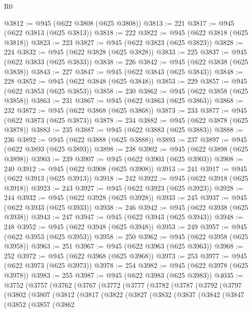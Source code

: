 \begin{lexlean}{R0}
\begin{coremodule}
@3812 := @945 (@622 @3808 (@625 @3808))
@3813 := 221
@3817 := @945 (@622 @3813 (@625 @3813))
@3818 := 222
@3822 := @945 (@622 @3818 (@625 @3818))
@3823 := 223
@3827 := @945 (@622 @3823 (@625 @3823))
@3828 := 224
@3832 := @945 (@622 @3828 (@625 @3828))
@3833 := 225
@3837 := @945 (@622 @3833 (@625 @3833))
@3838 := 226
@3842 := @945 (@622 @3838 (@625 @3838))
@3843 := 227
@3847 := @945 (@622 @3843 (@625 @3843))
@3848 := 228
@3852 := @945 (@622 @3848 (@625 @3848))
@3853 := 229
@3857 := @945 (@622 @3853 (@625 @3853))
@3858 := 230
@3862 := @945 (@622 @3858 (@625 @3858))
@3863 := 231
@3867 := @945 (@622 @3863 (@625 @3863))
@3868 := 232
@3872 := @945 (@622 @3868 (@625 @3868))
@3873 := 233
@3877 := @945 (@622 @3873 (@625 @3873))
@3878 := 234
@3882 := @945 (@622 @3878 (@625 @3878))
@3883 := 235
@3887 := @945 (@622 @3883 (@625 @3883))
@3888 := 236
@3892 := @945 (@622 @3888 (@625 @3888))
@3893 := 237
@3897 := @945 (@622 @3893 (@625 @3893))
@3898 := 238
@3902 := @945 (@622 @3898 (@625 @3898))
@3903 := 239
@3907 := @945 (@622 @3903 (@625 @3903))
@3908 := 240
@3912 := @945 (@622 @3908 (@625 @3908))
@3913 := 241
@3917 := @945 (@622 @3913 (@625 @3913))
@3918 := 242
@3922 := @945 (@622 @3918 (@625 @3918))
@3923 := 243
@3927 := @945 (@622 @3923 (@625 @3923))
@3928 := 244
@3932 := @945 (@622 @3928 (@625 @3928))
@3933 := 245
@3937 := @945 (@622 @3933 (@625 @3933))
@3938 := 246
@3942 := @945 (@622 @3938 (@625 @3938))
@3943 := 247
@3947 := @945 (@622 @3943 (@625 @3943))
@3948 := 248
@3952 := @945 (@622 @3948 (@625 @3948))
@3953 := 249
@3957 := @945 (@622 @3953 (@625 @3953))
@3958 := 250
@3962 := @945 (@622 @3958 (@625 @3958))
@3963 := 251
@3967 := @945 (@622 @3963 (@625 @3963))
@3968 := 252
@3972 := @945 (@622 @3968 (@625 @3968))
@3973 := 253
@3977 := @945 (@622 @3973 (@625 @3973))
@3978 := 254
@3982 := @945 (@622 @3978 (@625 @3978))
@3983 := 255
@3987 := @945 (@622 @3983 (@625 @3983))
@4035 := @3752
    (@3757
      (@3762
        (@3767
          (@3772
            (@3777
              (@3782
                (@3787
                  (@3792
                    (@3797
                      (@3802
                        (@3807
                          (@3812
                            (@3817
                              (@3822
                                (@3827
                                  (@3832
                                    (@3837
                                      (@3842
                                        (@3847
                                          (@3852
                                            (@3857
                                              (@3862

\end{coremodule}
\end{lexlean}
